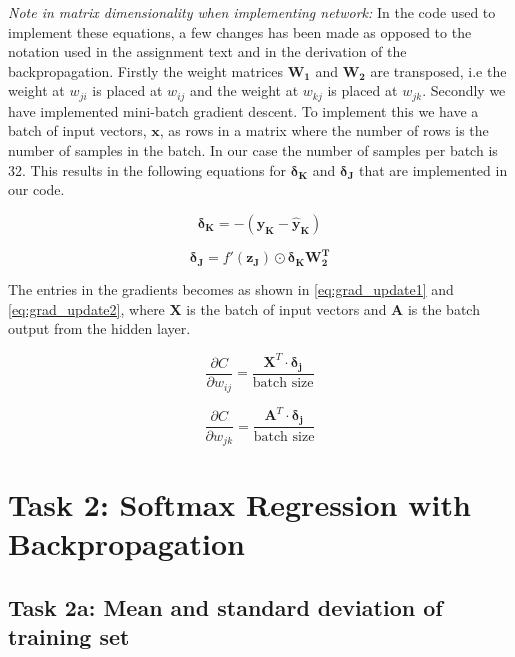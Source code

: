 \documentclass{article}
\begin{document}
\textit{Note in matrix dimensionality when implementing network:} In the code used to implement these equations, a few changes has been made as opposed to the notation used in the assignment text and in the derivation of the backpropagation. Firstly the weight matrices $\mathbf{W_1}$ and $\mathbf{W_2}$ are transposed, i.e the weight at $w_{ji}$ is placed at $w_{ij}$ and the weight at $w_{kj}$ is placed at $w_{jk}$. 
Secondly we have implemented mini-batch gradient descent. To implement this we have a batch of input vectors,  $\boldsymbol{x}$, as rows in a matrix where the number of rows is the number of samples in the batch. In our case the number of samples per batch is 32.  This results in the following equations for $\boldsymbol{\delta_K}$ and $\boldsymbol{\delta_J}$ that are implemented in our code. 


\begin{equation}
    \boldsymbol{\delta_K} = -(\boldsymbol{y_K} - \boldsymbol{\hat{y}_K})
\end{equation}

\begin{equation}
    \boldsymbol{\delta_J} = f'(\boldsymbol{z_J}) \odot  \boldsymbol{\delta_K}  \mathbf{W_2^T}
\end{equation}

The entries in the gradients becomes as shown in \autoref{eq:grad_update1} and \autoref{eq:grad_update2}, where $\mathbf{X}$ is the batch of input vectors and $\mathbf{A}$ is the batch output from the hidden layer. 


\begin{equation}
    \frac{\partial C}{\partial w_{ij}} = \frac{\mathbf{X}^T \cdot \boldsymbol{\delta_j}}{\text{batch size}} 
    \label{eq:grad_update1}
\end{equation}

\begin{equation}
    \frac{\partial C}{\partial w_{jk}} =  \frac{\mathbf{A}^T \cdot \boldsymbol{\delta_j}} {\text{batch size}}
    \label{eq:grad_update2}
\end{equation}


\section{Task 2: Softmax Regression with Backpropagation}

 \subsection{Task 2a: Mean and standard deviation of training set}
\end{document}
